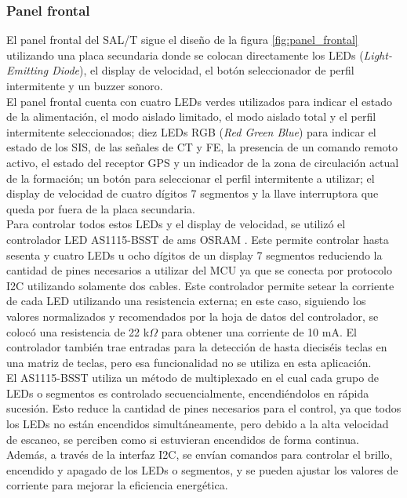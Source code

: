 \subsubsection{Panel frontal}


El panel frontal del SAL/T sigue el diseño de la figura \ref{fig:panel_frontal} utilizando una placa secundaria donde se colocan directamente los LEDs (\textit{Light-Emitting Diode}), el display de velocidad, el botón seleccionador de perfil intermitente y un buzzer sonoro. \\ 

El panel frontal cuenta con cuatro LEDs verdes utilizados para indicar el estado de la alimentación, el modo aislado limitado, el modo aislado total y el perfil intermitente seleccionados; diez LEDs RGB (\textit{Red Green Blue}) para indicar el estado de los SIS, de las señales de CT y FE, la presencia de un comando remoto activo, el estado del receptor GPS y un indicador de la zona de circulación actual de la formación; un botón para seleccionar el perfil intermitente a utilizar; el display de velocidad de cuatro dígitos 7 segmentos y la llave interruptora que queda por fuera de la placa secundaria. \\ 

Para controlar todos estos LEDs y el display de velocidad, se utilizó el controlador LED AS1115-BSST de ams OSRAM \cite{AS1115-BSST}. Este permite controlar hasta sesenta y cuatro LEDs u ocho dígitos de un display 7 segmentos reduciendo la cantidad de pines necesarios a utilizar del MCU ya que se conecta por protocolo I2C utilizando solamente dos cables. Este controlador permite setear la corriente de cada LED utilizando una resistencia externa; en este caso, siguiendo los valores normalizados y recomendados por la hoja de datos del controlador, se colocó una resistencia de 22 k$\Omega$ para obtener una corriente de 10 mA. El controlador también trae entradas para la detección de hasta dieciséis teclas en una matriz de teclas, pero esa funcionalidad no se utiliza en esta aplicación. \\



El AS1115-BSST utiliza un método de multiplexado en el cual cada grupo de LEDs o segmentos es controlado secuencialmente, encendiéndolos en rápida sucesión. Esto reduce la cantidad de pines necesarios para el control, ya que todos los LEDs no están encendidos simultáneamente, pero debido a la alta velocidad de escaneo, se perciben como si estuvieran encendidos de forma continua. Además, a través de la interfaz I2C, se envían comandos para controlar el brillo, encendido y apagado de los LEDs o segmentos, y se pueden ajustar los valores de corriente para mejorar la eficiencia energética.\\




